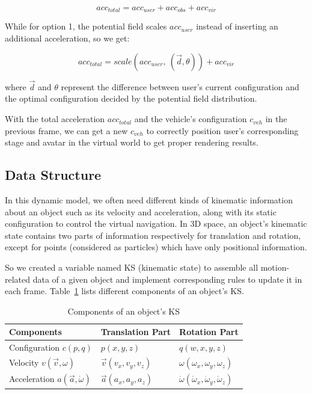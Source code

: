 \begin{equation}
acc_{total}=acc_{user}+acc_{obs}+acc_{vir}
\end{equation}

While for option 1, the potential field scales $acc_{user}$ instead of inserting an additional acceleration, so we get:

\begin{equation}
acc_{total}=scale(acc_{user},\: (\overrightarrow{d},\theta))+acc_{vir}
\end{equation}

where $\overrightarrow{d}$ and $\theta$ represent the difference between user's current configuration and the optimal configuration decided by the potential field distribution.

With the total acceleration $acc_{total}$ and the vehicle's configuration $c_{veh}$ in the previous frame, we can get a new $c_{veh}$ to correctly position user's corresponding stage and avatar in the virtual world to get proper rendering results.


\subsection{Data Structure}
In this dynamic model, we often need different kinds of kinematic information about an object such as its velocity and acceleration, along with its static configuration to control the virtual navigation. In 3D space, an object's kinematic state contains two parts of information respectively for translation and rotation, except for points (considered as particles) which have only positional information. 

So we created a variable named KS (kinematic state) to assemble all motion-related data of a given object and implement corresponding rules to update it in each frame. Table~\ref{tab:5_ks_components} lists different components of an object's KS.

\begin{table}[hbt]
\renewcommand{\arraystretch}{1.3}
\caption{Components of an object's KS}
\label{tab:5_ks_components}
\centering
\begin{tabular}{l l l}
  \hline
  Components & Translation Part & Rotation Part \\
  \hline
  Configuration $c(p, q)$ & $p(x, y, z)$ & $q(w, x, y, z)$ \\
  Velocity $v(\overrightarrow{v}, \omega)$ & $\overrightarrow{v}(v_{x}, v_{y}, v_{z})$ & $\omega(\omega_{x},\omega_{y},\omega_{z})$ \\
  Acceleration $a(\overrightarrow{a}, \dot{\omega})$ & $\overrightarrow{a}(a_{x}, a_{y}, a_{z})$ & $\dot{\omega}(\dot{\omega}_{x},\dot{\omega}_{y},\dot{\omega}_{z})$ \\
  \hline
\end{tabular}
\end{table}

